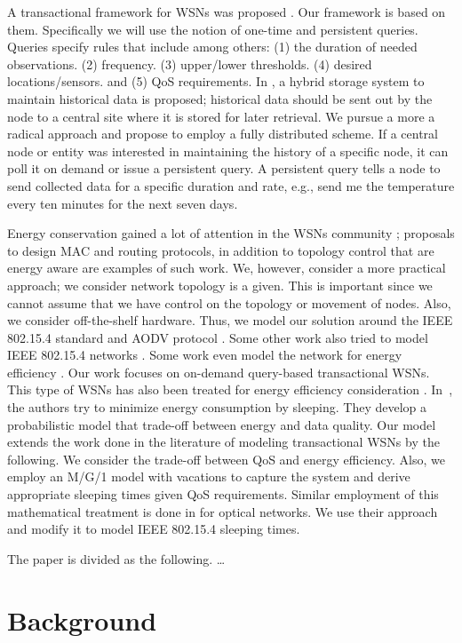 \documentclass[10pt, conference]{IEEEtran}
\begin{document}
A transactional framework for WSNs was proposed \cite{2, 24}. Our framework is based on them. Specifically we will use the notion of one-time and persistent queries. Queries specify rules that include among others: (1) the duration of needed observations. (2) frequency. (3) upper/lower thresholds. (4) desired locations/sensors. and (5) QoS requirements. In \cite{2}, a hybrid storage system to maintain historical data is proposed; historical data should be sent out by the node to a central site where it is stored for later retrieval. We pursue a more a radical approach and propose to employ a fully distributed scheme. If a central node or entity was interested in maintaining the history of a specific node, it can poll it on demand or issue a persistent query. A persistent query tells a node to send collected data for a specific duration and rate, e.g., send me the temperature every ten minutes for the next seven days.

Energy conservation gained a lot of attention in the WSNs community \cite{1,5,6,7}; proposals to design MAC and routing protocols, in addition to topology control that are energy aware are examples of such work. We, however, consider a more practical approach; we consider network topology is a given. This is important since we cannot assume that we have control on the topology or movement of nodes. Also, we consider off-the-shelf hardware. Thus, we model our solution around the IEEE 802.15.4 standard and AODV protocol \cite{aodv}. Some other work also tried to model IEEE 802.15.4 networks \cite{8,9,10,4.11,12,13}. Some work even model the network for energy efficiency \cite{10,12,13}. Our work focuses on on-demand query-based transactional WSNs. This type of WSNs has also been treated for energy efficiency consideration \cite{14,25}. In~\cite{25}, the authors try to minimize energy consumption by sleeping. They develop a probabilistic model that trade-off between energy and data quality. Our model extends the work done in the literature of modeling transactional WSNs by the following. We consider the trade-off between QoS and energy efficiency. Also, we employ an M/G/1 model with vacations to capture the system and derive appropriate sleeping times given QoS requirements. Similar employment of this mathematical treatment is done in \cite{15} for optical networks. We use their approach and modify it to model IEEE 802.15.4 sleeping times.

The paper is divided as the following. \ldots

\section{Background}\label{sec:background}
\end{document}
